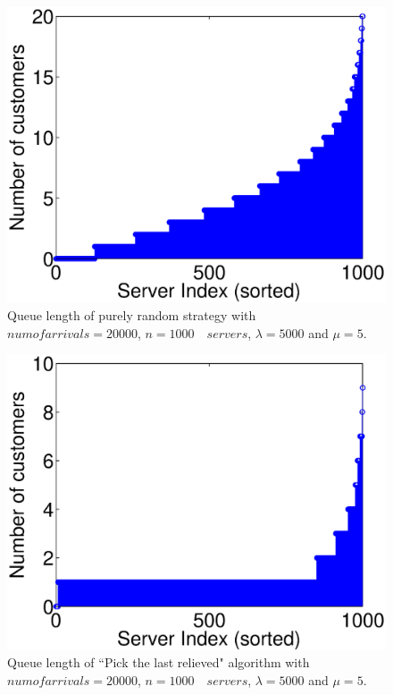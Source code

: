 \documentclass[a4paper,english,11pt]{article}
\begin{document}
\begin{figure}[H]
\centering
\includegraphics[scale=0.55]{Random_quelength.eps}
\caption{Queue length of purely random strategy with $num of arrivals = 20000$, $n = 1000 \quad servers$, $\lambda = 5000$ and $\mu = 5$.} 
\end{figure}


\begin{figure}[H]
\centering
\includegraphics[scale=0.55]{Lastreleiving_quelength.eps}
\caption{Queue length of ``Pick the last relieved" algorithm with $num of arrivals = 20000$, $n = 1000 \quad servers$, $\lambda = 5000$ and $\mu = 5$.} 
\end{figure}
\end{document}
